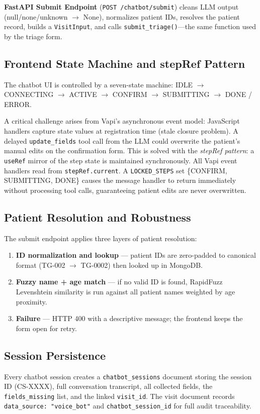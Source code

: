 \documentclass[conference]{IEEEtran}
\begin{document}
\textbf{FastAPI Submit Endpoint} (\texttt{POST /chatbot/submit}) cleans LLM output (null/none/unknown $\rightarrow$ None), normalizes patient IDs, resolves the patient record, builds a \texttt{VisitInput}, and calls \texttt{submit\_triage()}---the same function used by the triage form.

\subsection{Frontend State Machine and stepRef Pattern}
The chatbot UI is controlled by a seven-state machine: IDLE $\rightarrow$ CONNECTING $\rightarrow$ ACTIVE $\rightarrow$ CONFIRM $\rightarrow$ SUBMITTING $\rightarrow$ DONE / ERROR.

A critical challenge arises from Vapi's asynchronous event model: JavaScript handlers capture state values at registration time (stale closure problem). A delayed \texttt{update\_fields} tool call from the LLM could overwrite the patient's manual edits on the confirmation form. This is solved with the \textit{stepRef pattern}: a \texttt{useRef} mirror of the step state is maintained synchronously. All Vapi event handlers read from \texttt{stepRef.current}. A \texttt{LOCKED\_STEPS} set \{CONFIRM, SUBMITTING, DONE\} causes the message handler to return immediately without processing tool calls, guaranteeing patient edits are never overwritten.

\subsection{Patient Resolution and Robustness}
The submit endpoint applies three layers of patient resolution:
\begin{enumerate}
\item \textbf{ID normalization and lookup} --- patient IDs are zero-padded to canonical format (TG-002 $\rightarrow$ TG-0002) then looked up in MongoDB.
\item \textbf{Fuzzy name + age match} --- if no valid ID is found, RapidFuzz Levenshtein similarity is run against all patient names weighted by age proximity.
\item \textbf{Failure} --- HTTP 400 with a descriptive message; the frontend keeps the form open for retry.
\end{enumerate}

\subsection{Session Persistence}
Every chatbot session creates a \texttt{chatbot\_sessions} document storing the session ID (CS-XXXX), full conversation transcript, all collected fields, the \texttt{fields\_missing} list, and the linked \texttt{visit\_id}. The visit document records \texttt{data\_source: "voice\_bot"} and \texttt{chatbot\_session\_id} for full audit traceability.
\end{document}
